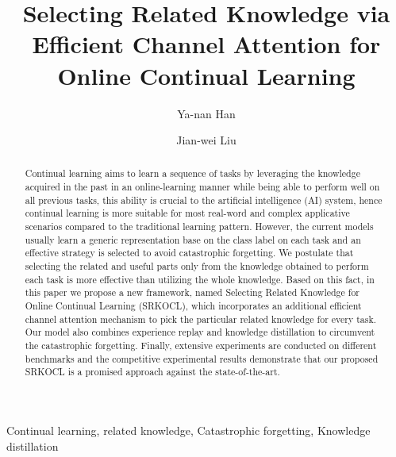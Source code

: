 \documentclass[review]{elsarticle}
\begin{document}
\begin{frontmatter}

\title{Selecting Related Knowledge via Efficient Channel Attention for Online Continual Learning}



\author[mymainaddress]{Ya-nan Han}

\author[mymainaddress]{Jian-wei Liu}

\address[mymainaddress]{Department of Automation, College of Information Science and Engineering,
China University of Petroleum , Beijing, Beijing, China}

\begin{abstract}%
Continual learning aims to learn a sequence of tasks by leveraging the knowledge acquired in the past in an online-learning manner while being able to perform well on all previous tasks, this ability is crucial to the artificial intelligence (AI) system, hence continual learning is more suitable for most real-word and complex applicative scenarios compared to the traditional learning pattern. However, the current models usually learn a generic representation base on the class label on each task and an effective strategy is selected to avoid catastrophic forgetting. We postulate that selecting the related and useful parts only from the knowledge obtained to perform each task is more effective than utilizing the whole knowledge. Based on this fact, in this paper we propose a new framework, named Selecting Related Knowledge for Online Continual Learning (SRKOCL), which incorporates an additional efficient channel attention mechanism to pick the particular related knowledge for every task. Our model also combines experience replay and knowledge distillation to circumvent the catastrophic forgetting. Finally, extensive experiments are conducted on different benchmarks and the competitive experimental results demonstrate that our proposed SRKOCL is a promised approach against the state-of-the-art.
\end{abstract}

\begin{keyword}%
Continual learning, related knowledge, Catastrophic forgetting, Knowledge distillation
\end{keyword}

\end{frontmatter}
\end{document}
